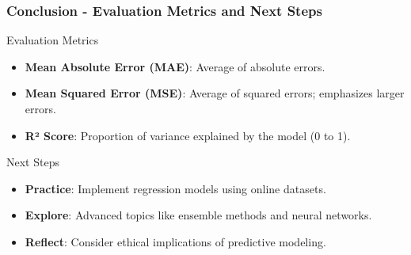 \documentclass[aspectratio=169]{beamer}
\begin{document}
\begin{frame}[fragile]
    \frametitle{Conclusion - Evaluation Metrics and Next Steps}
    \begin{block}{Evaluation Metrics}
        \begin{itemize}
            \item \textbf{Mean Absolute Error (MAE)}: Average of absolute errors.
            \item \textbf{Mean Squared Error (MSE)}: Average of squared errors; emphasizes larger errors.
            \item \textbf{R² Score}: Proportion of variance explained by the model (0 to 1).
        \end{itemize}
    \end{block}
    \begin{block}{Next Steps}
        \begin{itemize}
            \item \textbf{Practice}: Implement regression models using online datasets.
            \item \textbf{Explore}: Advanced topics like ensemble methods and neural networks.
            \item \textbf{Reflect}: Consider ethical implications of predictive modeling.
        \end{itemize}
    \end{block}
\end{frame}
\end{document}
